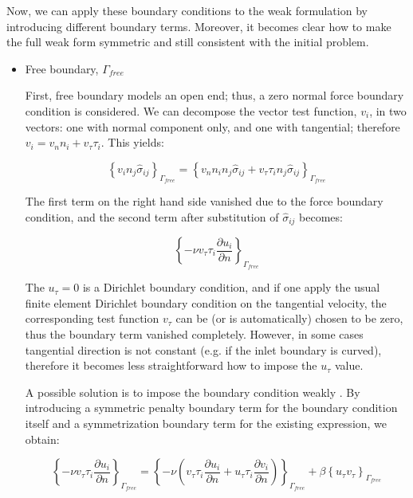 Now, we can apply these boundary conditions to the weak formulation by introducing different boundary terms. Moreover, it becomes clear how to make the full weak form symmetric and still consistent with the initial problem.

\begin{itemize}
  \item Free boundary, $\Gamma_{free}$
  
  First, free boundary models an open end; thus, a zero normal force boundary condition is considered. We can decompose the vector test function, $v_i$, in two vectors: one with normal component only, and one with tangential; therefore $v_i = v_n n_i + v_{\tau} \tau_i$. This yields:
  
  \begin{equation}
  \left\{ v_i n_j \hat{\sigma}_{ij} \right\}_{\Gamma_{free}} = \left\{ v_n n_i n_j \hat{\sigma}_{ij} + v_{\tau} \tau_i n_j \hat{\sigma}_{ij} \right\}_{\Gamma_{free}}
  \end{equation}
  
  The first term on the right hand side vanished due to the force boundary condition, and the second term after substitution of $\hat{\sigma}_{ij}$ becomes:
  
  \begin{equation}
  \left\{ - \nu v_{\tau} \tau_i \frac{\partial u_i}{\partial n} \right\}_{\Gamma_{free}}
  \end{equation}
  
  The $u_{\tau} = 0$ is a Dirichlet boundary condition, and if one apply the usual finite element Dirichlet boundary condition on the tangential velocity, the corresponding test function $v_{\tau}$ can be (or is automatically) chosen to be zero, thus the boundary term vanished completely. However, in some cases tangential direction is not constant (e.g. if the inlet boundary is curved), therefore it becomes less straightforward how to impose the $u_{\tau}$ value.
  
  A possible solution is to impose the boundary condition weakly \cite{Nitsche1971}. By introducing a symmetric penalty boundary term for the boundary condition itself and a symmetrization boundary term for the existing expression, we obtain:
  
  \begin{equation}
  \left\{ - \nu  v_{\tau} \tau_i \frac{\partial u_i}{\partial n} \right\}_{\Gamma_{free}} = \left\{ - \nu \left( v_{\tau} \tau_i \frac{\partial u_i}{\partial n}  + u_{\tau} \tau_i \frac{\partial v_i}{\partial n} \right) \right\}_{\Gamma_{free}} + \beta \left\{  u_{\tau}  v_{\tau} \right\}_{\Gamma_{free}}
  \end{equation}
  

\end{itemize}
